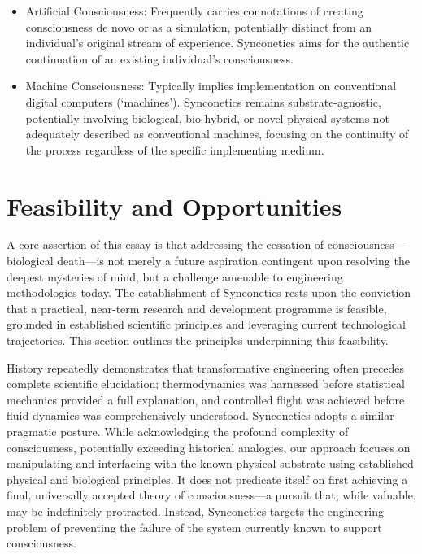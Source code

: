 \documentclass[10pt]{article}
\begin{document}
\begin{sloppypar}
\begin{itemize}
    \item Artificial Consciousness: Frequently carries connotations of creating consciousness de novo or as a simulation, potentially distinct from an individual’s original stream of experience. Synconetics aims for the authentic continuation of an existing individual’s consciousness.

    \item Machine Consciousness: Typically implies implementation on conventional digital computers (‘machines’). Synconetics remains substrate-agnostic, potentially involving biological, bio-hybrid, or novel physical systems not adequately described as conventional machines, focusing on the continuity of the process regardless of the specific implementing medium.
  \end{itemize}

  \section{Feasibility and Opportunities}
  \label{sec:feasibility}

  A core assertion of this essay is that addressing the cessation of consciousness—biological death—is not merely a future aspiration contingent upon resolving the deepest mysteries of mind, but a challenge amenable to engineering methodologies today. The establishment of Synconetics rests upon the conviction that a practical, near-term research and development programme is feasible, grounded in established scientific principles and leveraging current technological trajectories. This section outlines the principles underpinning this feasibility.

  History repeatedly demonstrates that transformative engineering often precedes complete scientific elucidation; thermodynamics was harnessed before statistical mechanics provided a full explanation, and controlled flight was achieved before fluid dynamics was comprehensively understood. Synconetics adopts a similar pragmatic posture. While acknowledging the profound complexity of consciousness, potentially exceeding historical analogies, our approach focuses on manipulating and interfacing with the known physical substrate using established physical and biological principles. It does not predicate itself on first achieving a final, universally accepted theory of consciousness—a pursuit that, while valuable, may be indefinitely protracted. Instead, Synconetics targets the engineering problem of preventing the failure of the system currently known to support consciousness.


\end{sloppypar}
\end{document}
